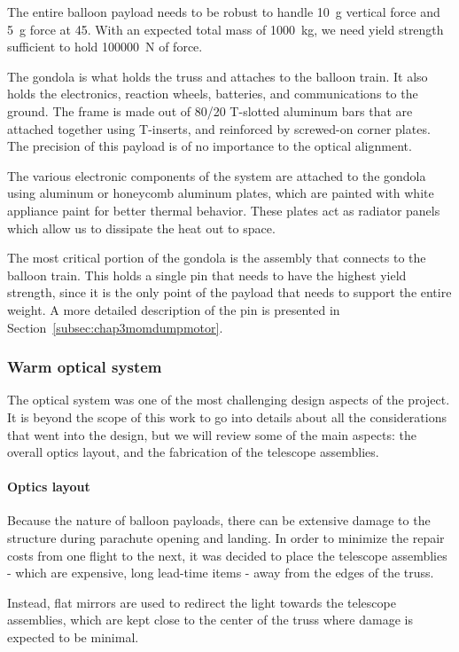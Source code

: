 The entire balloon payload needs to be robust to handle 10~g vertical force and 5~g force at \SI{45}{\deg}. With an expected total mass of \SI{1000}{\kilo\gram}, we need yield strength sufficient to hold \SI{100000}{\newton} of force. 

The gondola is what holds the truss and attaches to the balloon train. It also holds the electronics, reaction wheels, batteries, and communications to the ground. The frame is made out of 80/20 T-slotted aluminum bars that are attached together using T-inserts, and reinforced by screwed-on corner plates. The precision of this payload is of no importance to the optical alignment. 

The various electronic components of the system are attached to the gondola using aluminum or honeycomb aluminum plates, which are painted with white appliance paint for better thermal behavior. These plates act as radiator panels which allow us to dissipate the heat out to space.

The most critical portion of the gondola is the assembly that connects to the balloon train. This holds a single pin that needs to have the highest yield strength, since it is the only point of the payload that needs to support the entire weight. A more detailed description of the pin is presented in Section~\ref{subsec:chap3momdumpmotor}.



\subsubsection{Warm optical system}

The optical system was one of the most challenging design aspects of the project. It is beyond the scope of this work to go into details about all the considerations that went into the design, but we will review some of the main aspects: the overall optics layout, and the fabrication of the telescope assemblies.

\paragraph{Optics layout}
Because the nature of balloon payloads, there can be extensive damage to the structure during parachute opening and landing. In order to minimize the repair costs from one flight to the next, it was decided to place the telescope assemblies - which are expensive, long lead-time items - away from the edges of the truss. 

Instead, flat mirrors are used to redirect the light towards the telescope assemblies, which are kept close to the center of the truss where damage is expected to be minimal. 

